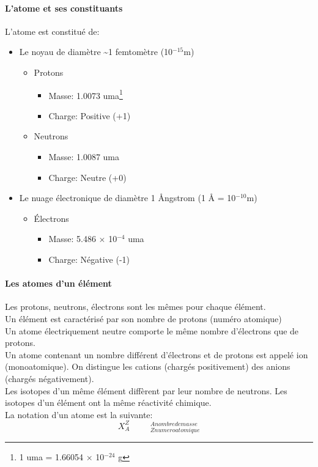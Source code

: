 \documentclass[10pt,a4paper]{book}
\begin{document}
\paragraph{L'atome et ses constituants} L'atome est constitué de:
\begin{itemize}
\item Le noyau de diamètre \textasciitilde 1 femtomètre (10$^{-15}$m)
\begin{itemize}
\item Protons
\begin{itemize}
	\item Masse: 1.0073 uma\footnote{1 uma = 1.66054 $\times$ 10$^{-24}$ g}
	\item Charge: Positive (+1) 
\end{itemize}
\item Neutrons
\begin{itemize}
	\item Masse: 1.0087 uma
	\item Charge: Neutre (+0) 
\end{itemize}
\end{itemize}
\item Le nuage électronique de diamètre 1 {\AA}ngstrom (1 {\AA} = 10$^{-10}$m)
\begin{itemize}
\item Électrons
\begin{itemize}
	\item Masse: 5.486 $\times$ 10$^{-4}$ uma
	\item Charge: Négative (-1) 
\end{itemize}
\end{itemize}
\end{itemize}
\paragraph{Les atomes d'un élément} Les protons, neutrons, électrons sont les mêmes pour chaque élément. \\ 
Un élément est caractérisé par son nombre de protons (numéro
atomique) \\
Un atome électriquement neutre comporte le même nombre d’électrons
que de protons.\\
Un atome contenant un nombre différent d’électrons et
de protons est appelé ion (monoatomique). On distingue les cations (chargés positivement) des anions (chargés négativement). \\ 
Les isotopes d’un même élément diffèrent par leur nombre de
neutrons. Les isotopes d’un élément ont la même réactivité chimique.\\
La notation d'un atome est la suivante: \\
\textbf{\[{X_A^Z} \hspace{1cm} { }_{Z numero atomique}^{A nombre de masse}\]} %
\end{document}

